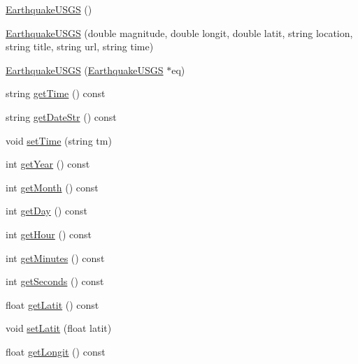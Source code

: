 \begin{DoxyCompactItemize}
\item 
\hyperlink{classbridges_1_1_earthquake_u_s_g_s_a540ae74c248da179fbbd182b843a14e0}{Earthquake\+U\+S\+G\+S} ()
\item 
\hyperlink{classbridges_1_1_earthquake_u_s_g_s_a9c7f7aec2ddc173660a7015b90c7b7b0}{Earthquake\+U\+S\+G\+S} (double magnitude, double longit, double latit, string location, string title, string url, string time)
\item 
\hyperlink{classbridges_1_1_earthquake_u_s_g_s_aa52d05b3119c6a4e45867dc4aaeba59e}{Earthquake\+U\+S\+G\+S} (\hyperlink{classbridges_1_1_earthquake_u_s_g_s}{Earthquake\+U\+S\+G\+S} $\ast$eq)
\item 
string \hyperlink{classbridges_1_1_earthquake_u_s_g_s_af8230252cb495e2c87bdd0ed1fbd609f}{get\+Time} () const 
\item 
string \hyperlink{classbridges_1_1_earthquake_u_s_g_s_a74d02315dd50f0d41d0340655c700aff}{get\+Date\+Str} () const 
\item 
void \hyperlink{classbridges_1_1_earthquake_u_s_g_s_a70d79cd5c3666b8a32b1d45d7364054b}{set\+Time} (string tm)
\item 
int \hyperlink{classbridges_1_1_earthquake_u_s_g_s_af82196433d7fc04e309e37d902706c8d}{get\+Year} () const 
\item 
int \hyperlink{classbridges_1_1_earthquake_u_s_g_s_a9d9a998b0092f59e9b45a9c0af715813}{get\+Month} () const 
\item 
int \hyperlink{classbridges_1_1_earthquake_u_s_g_s_a469f812e467023eb9dceaa1519c8f8b8}{get\+Day} () const 
\item 
int \hyperlink{classbridges_1_1_earthquake_u_s_g_s_a2c0989152166d3ec0d3cc7feab7e9093}{get\+Hour} () const 
\item 
int \hyperlink{classbridges_1_1_earthquake_u_s_g_s_aa85673b9c3e8fdeedfd3ed9ae38507e2}{get\+Minutes} () const 
\item 
int \hyperlink{classbridges_1_1_earthquake_u_s_g_s_a73486c57f8f9e4b6cedce1907fb5ae0a}{get\+Seconds} () const 
\item 
float \hyperlink{classbridges_1_1_earthquake_u_s_g_s_a0bc39612708b8333f7c03500ccc6d614}{get\+Latit} () const 
\item 
void \hyperlink{classbridges_1_1_earthquake_u_s_g_s_a143678bb9dd697f82dcb260ddab78f82}{set\+Latit} (float latit)
\item 
float \hyperlink{classbridges_1_1_earthquake_u_s_g_s_a4387cf6d8ea0922558cb07fbd9d5b23e}{get\+Longit} () const 
\item 

\end{DoxyCompactItemize}
